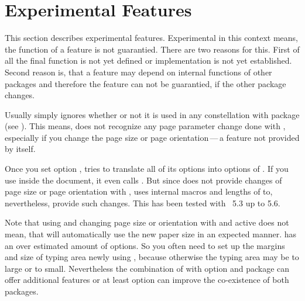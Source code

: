 \section{Experimental Features}

This section describes experimental features. Experimental in this context
means, the function of a feature is not guarantied. There are two reasons for
this. First of all the final function is not yet defined or implementation is
not yet established. Second reason is, that a feature may depend on internal
functions of other packages and therefore the feature can not be guarantied,
if the other package changes.

\begin{Declaration}
\end{Declaration}
Usually  simply ignores whether or not it is used in any
constellation with package  (see
\cite{package:geometry}). This means,  does not recognize
any page parameter change done with , especially if you
change the page size or page orientation\,---\,a feature not provided by
 itself.

Once you set option ,  tries to
translate all of its options into options of . If you use
 inside the document, it even calls . But
since  does not provide changes of page size or page
orientation with ,  uses internal macros
and lengths of  to, nevertheless, provide such changes. This
has been tested with ~5.3 up to 5.6.

Note that using  and changing page size or orientation with
 and active  does not mean, that
 will automatically use the new paper size in an expected
manner.  has an over estimated amount of options. So you
often need to set up the margins and size of typing area newly using
, because otherwise the typing area may be to large or to
small. Nevertheless the combination of  with option
 and package  can offer additional
features or at least option  can improve the co-existence
of both packages.%
\EndIndexGroup


